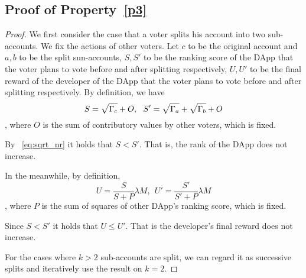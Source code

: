 \subsection{Proof of Property~\ref{p3}}
\begin{proof}
	We first consider the case that a voter splits his account into two sub-accounts. We fix the actions of other voters. Let $c$ to be the original account and $a,b$ to be the split sun-accounts, $S,S'$ to be the ranking score of the DApp that the voter plans to vote before and after splitting respectively, $U,U'$ to be the final reward of the developer of the DApp that the voter plans to vote before and after splitting respectively. By definition, we have 
	$$S= \sqrt{\Gamma_c}+O,~~S'=\sqrt{\Gamma_a}+\sqrt{\Gamma_b}+O$$,
	where $O$ is the sum of contributory values by other voters, which is fixed. 
	
	By ~\ref{eq:sqrt_nr} it holds that $S < S'$. That is, the rank of the DApp does not increase. 
	
	In the meanwhile, by definition, 
	$$U = \frac{S}{S+P}\lambda M,~~U' = \frac{S'}{S'+P} \lambda M$$,
	where $P$ is the sum of squares of other DApp's ranking score, which is fixed. 
	
	Since $S < S'$ it holds that $U \leq U'$. That is the developer's final reward does not increase.
	
	For the cases where $k>2$ sub-accounts are split, we can regard it as successive splits and iteratively use the result on $k=2$. 
	
\end{proof}